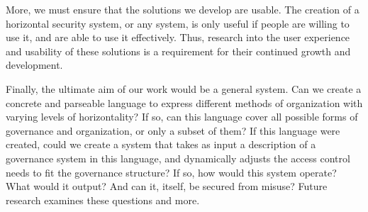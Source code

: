 More, we must ensure that the solutions we develop are usable. The creation of
a horizontal security system, or any system,  is only useful if people are
willing to use it, and are able to use it effectively. Thus, research into the
user experience and usability of these solutions is a requirement for their
continued growth and development.

Finally, the ultimate aim of our work would be a general system. Can we create a
concrete and parseable language to express different methods of organization
with varying levels of horizontality? If so, can this language cover all
possible forms of governance and organization, or only a subset of them? If this
language were created, could we create a system that takes as input a
description of a governance system in this language, and dynamically adjusts the
access control needs to fit the governance structure? If so, how would this
system operate? What would it output? And can it, itself, be secured from
misuse? Future research examines these questions and more.

